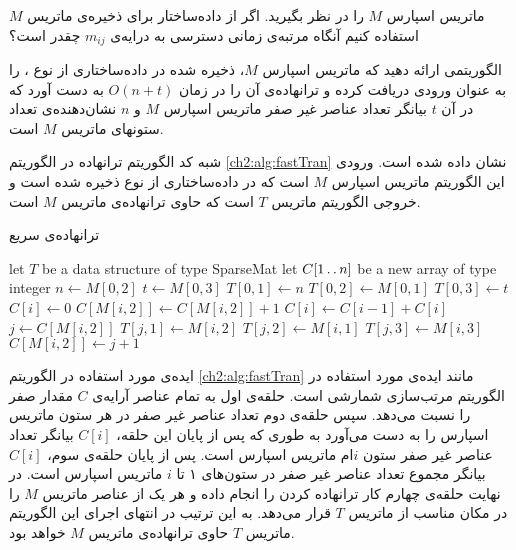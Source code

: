  ماتریس اسپارس {$M$} را در نظر بگیرید. اگر از داده‌ساختار {} برای ذخیره‌ی ماتریس {$M$} استفاده کنیم آنگاه مرتبه‌ی زمانی دسترسی به درایه‌ی {$m_{ij}$} چقدر است؟


 الگوریتمی ارائه دهید که ماتریس اسپارس {$M$}، ذخیره شده در داده‌ساختاری از نوع {}، را به عنوان ورودی دریافت کرده و ترانهاده‌ی آن را در زمان {$O(n+t)$} به دست آورد که در آن {$t$} بیانگر تعداد عناصر غیر صفر ماتریس اسپارس {$M$} و {$n$} نشان‌دهنده‌ی تعداد ستونهای ماتریس {$M$} است.


شبه کد الگوریتم ترانهاده در الگوریتم {\ref{ch2:alg:fastTran}} نشان داده شده است. ورودی این الگوریتم ماتریس اسپارس {$M$} است که در داده‌ساختاری از نوع {} ذخیره شده است و خروجی الگوریتم ماتریس {$T$} است که حاوی ترانهاده‌ی ماتریس {$M$} است.
\begin{algorithm}
\caption{ترانهاده‌‌ی سریع}\label{ch2:alg:fastTran}
\begin{latin}
\begin{algorithmic}[1]
		\State	let $T$ be a data structure of type SparseMat
		\State	let $C[1\mathinner{\ldotp\ldotp} n]$ be a new array of type integer
		\State	$n \gets M[0,2]$
 		\State	$t \gets M[0,3]$
		\State	$T[0,1] \gets n$
		\State 	$T[0,2] \gets M[0,1]$
		\State	$T[0,3] \gets t$
				\State	\Return
		\Else							
						\State	$C[i] \gets 0$
				\EndFor
						\State	$C[M[i,2]] \gets C[M[i,2]]+1$		
				\EndFor	
						\State	$C[i] \gets C[i-1]+C[i]$		
				\EndFor	
						\State	$j \gets C[M[i,2]]$		
						\State	$T[j,1] \gets M[i,2]$
						\State	$T[j,2] \gets M[i,1]$
						\State	$T[j,3] \gets M[i,3]$
						\State	$C[M[i,2]] \gets j+1$
				\EndFor		
		\EndIf
\EndProcedure
\end{algorithmic}
\end{latin}
\end{algorithm}

ایده‌ی مورد استفاده در الگوریتم {\ref{ch2:alg:fastTran}} مانند ایده‌ی مورد استفاده در الگوریتم مرتب‌سازی شمارشی است. حلقه‌ی اول به تمام عناصر آرایه‌ی {$C$} مقدار صفر را نسبت می‌دهد. سپس حلقه‌ی دوم تعداد عناصر غیر صفر در هر ستون ماتریس اسپارس را به دست می‌آورد به طوری که پس از پایان این حلقه، {$C[i]$} بیانگر تعداد عناصر غیر صفر ستون {$i$}ام ماتریس اسپارس است. پس از پایان حلقه‌ی سوم، {$C[i]$} بیانگر مجموع تعداد عناصر غیر صفر در ستون‌های ۱ تا {$i$} ماتریس اسپارس است. در نهایت حلقه‌ی چهارم کار ترانهاده کردن را انجام داده و هر یک از عناصر ماتریس {$M$} را در مکان مناسب از ماتریس {$T$} قرار می‌دهد. به این ترتیب در انتهای اجرای این الگوریتم ماتریس {$T$} حاوی ترانهاده‌ی ماتریس {$M$} خواهد بود.

